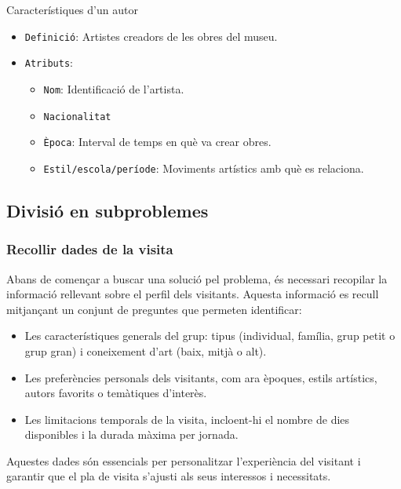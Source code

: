 \documentclass[a4paper]{article}
\begin{document}
	Característiques d'un autor
	\begin{itemize}
		\item \texttt{Definició}: Artistes creadors de les obres del museu.
		\item \texttt{Atributs}:
		\begin{itemize}
			\item \texttt{Nom}: Identificació de l’artista.
			\item \texttt{Nacionalitat}
			\item \texttt{Època}: Interval de temps en què va crear obres.
			\item \texttt{Estil/escola/període}: Moviments artístics amb què es relaciona.
		\end{itemize}
	\end{itemize}
	
	\subsection{Divisió en subproblemes}
	
	\subsubsection{Recollir dades de la visita}
	
	Abans de començar a buscar una solució pel problema, és necessari recopilar la informació rellevant sobre el perfil dels visitants. Aquesta informació es recull mitjançant un conjunt de preguntes que permeten identificar:
	\begin{itemize}
		\item Les característiques generals del grup: tipus (individual, família, grup petit o grup gran) i coneixement d’art (baix, mitjà o alt).
		\item Les preferències personals dels visitants, com ara èpoques, estils artístics, autors favorits o temàtiques d’interès.
		\item Les limitacions temporals de la visita, incloent-hi el nombre de dies disponibles i la durada màxima per jornada.
	\end{itemize}
	
	Aquestes dades són essencials per personalitzar l’experiència del visitant i garantir que el pla de visita s’ajusti als seus interessos i necessitats.
	
\end{document}
